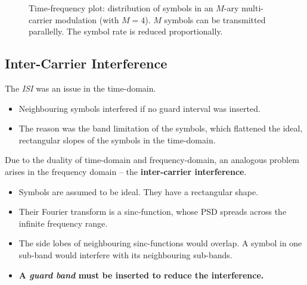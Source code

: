 \begin{refsection}
\begin{figure}[H]
	\caption[Time-frequency plot: distribution of symbols in an $M$-ary multi-carrier modulation (with $M = 4$)]{Time-frequency plot: distribution of symbols in an $M$-ary multi-carrier modulation (with $M = 4$). $M$ symbols can be transmitted parallelly. The symbol rate is reduced proportionally.}
	\label{fig:ch07:mulcarr_mod_spectrum}
\end{figure}

\subsection{Inter-Carrier Interference}

The \emph{\ac{ISI}} was an issue in the time-domain.
\begin{itemize}
	\item Neighbouring symbols interfered if no guard interval was inserted.
	\item The reason was the band limitation of the symbols, which flattened the ideal, rectangular slopes of the symbols in the time-domain.
\end{itemize}

Due to the duality of time-domain and frequency-domain, an analogous problem arises in the frequency domain -- the  \textbf{inter-carrier interference}.
\begin{itemize}
	\item Symbols are assumed to be ideal. They have a rectangular shape.
	\item Their Fourier transform is a sinc-function, whose \ac{PSD} spreads across the infinite frequency range.
	\item The side lobes of neighbouring sinc-functions would overlap. A symbol in one sub-band would interfere with its neighbouring sub-bands.
	\item \textbf{A \emph{guard band} must be inserted to reduce the interference.}
\end{itemize}


\end{refsection}
